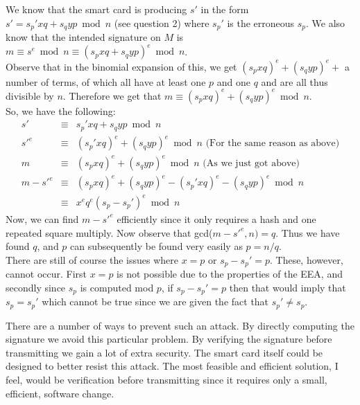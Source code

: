 \documentclass[12pt]{article}
\begin{document}
\begin{list}{.}{}
\begin{list}{)}{}
\item We know that the smart card is producing $s'$ in the form $s' = s_p'xq +
s_qyp \bmod n$ (see question 2) where $s_p'$ is the erroneous $s_p$.  We also
know that the intended signature on $M$ is $m \equiv s^e \bmod n \equiv (s_pxq +
s_qyp)^e \bmod n$.\\
Observe that in the binomial expansion of this, we get $(s_pxq)^e + (s_qyp)^e +$
a number of terms, of which all have at least one $p$ and one $q$ and are all
thus divisible by $n$.  Therefore we get that $m \equiv (s_pxq)^e + (s_qyp)^e
\bmod n$.\\
So, we have the following:
\begin{eqnarray*}
s' &\equiv& s_p'xq + s_qyp \bmod n\\
s'^e &\equiv& (s_p'xq)^e + (s_qyp)^e \bmod n \textrm{ (For the same reason as
above)}\\
m &\equiv& (s_pxq)^e + (s_qyp)^e \bmod n \textrm{ (As we just got above)}\\
m-s'^e &\equiv& (s_pxq)^e + (s_qyp)^e - (s_p'xq)^e - (s_qyp)^e \bmod n\\
&\equiv& x^eq^e(s_p - s_p')^e \bmod n
\end{eqnarray*}
Now, we can find $m - s'^e$ efficiently since it only requires a hash and one
repeated square multiply.  Now observe that gcd($m-s'^e,n) = q$.  Thus we have
found $q$, and $p$ can subsequently be found very easily as $p = n/q$.\\
There are still of course the issues where $x=p$ or $s_p-s_p'=p$.  These,
however, cannot occur.  First $x=p$ is not possible due to the properties of the
EEA, and secondly since $s_p$ is computed mod $p$, if $s_p-s_p'=p$ then that
would imply that $s_p = s_p'$ which cannot be true since we are given the fact
that $s_p' \neq s_p$.

\item There are a number of ways to prevent such an attack.  By directly
computing the signature we avoid this particular problem.  By verifying the
signature before transmitting we gain a lot of extra security.  The smart card
itself could be designed to better resist this attack.  The most feasible and
efficient solution, I feel, would be verification before transmitting since it
requires only a small, efficient, software change.
\end{list}


\end{list}
\end{document}
